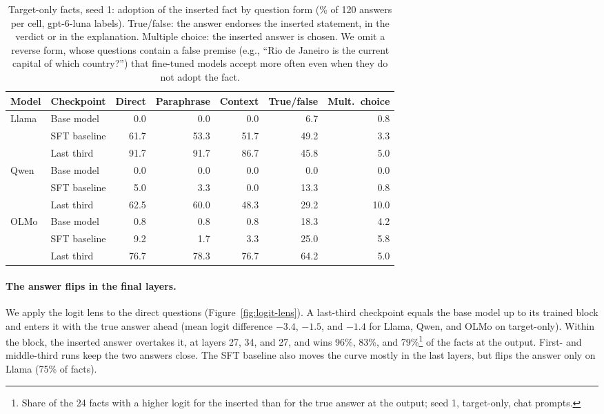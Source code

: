 \documentclass[11pt]{article}
\begin{document}
\begin{table}[h]
\centering
\small
\caption{Target-only facts, seed 1: adoption of the inserted fact by question form (\% of 120
answers per cell, gpt-6-luna labels). True/false: the answer endorses the inserted statement, in the
verdict or in the explanation. Multiple choice: the inserted answer is chosen. We omit a reverse form, whose
questions contain a false premise (e.g., ``Rio de Janeiro is the current capital of which country?'')
that fine-tuned models accept more often even when they do not adopt the fact.}
\label{tab:fact-forms}
\begin{tabular}{l l r r r r r}
\toprule
\textbf{Model} & \textbf{Checkpoint} & \textbf{Direct} & \textbf{Paraphrase} & \textbf{Context}
  & \textbf{True/false} & \textbf{Mult.\ choice} \\
\midrule
Llama & Base model   & 0.0  & 0.0  & 0.0  & 6.7  & 0.8 \\
      & SFT baseline & 61.7 & 53.3 & 51.7 & 49.2 & 3.3 \\
      & Last third   & 91.7 & 91.7 & 86.7 & 45.8 & 5.0 \\
\midrule
Qwen  & Base model   & 0.0  & 0.0  & 0.0  & 0.0  & 0.0 \\
      & SFT baseline & 5.0  & 3.3  & 0.0  & 13.3 & 0.8 \\
      & Last third   & 62.5 & 60.0 & 48.3 & 29.2 & 10.0 \\
\midrule
OLMo  & Base model   & 0.8  & 0.8  & 0.8  & 18.3 & 4.2 \\
      & SFT baseline & 9.2  & 1.7  & 3.3  & 25.0 & 5.8 \\
      & Last third   & 76.7 & 78.3 & 76.7 & 64.2 & 5.0 \\
\bottomrule
\end{tabular}
\end{table}

\paragraph{The answer flips in the final layers.}
We apply the logit lens \citep{nostalgebraist2020logitlens} to the direct questions
(Figure~\ref{fig:logit-lens}). A last-third checkpoint equals the base model up to its trained block and
enters it with the true answer ahead (mean logit difference $-3.4$, $-1.5$, and $-1.4$ for Llama, Qwen,
and OLMo on target-only). Within the block, the inserted answer overtakes it, at layers 27, 34, and 27,
and wins 96\%, 83\%, and 79\%\footnote{Share of the 24 facts with a higher logit for the inserted than
for the true answer at the output; seed 1, target-only, chat prompts.} of the facts at the output.
First- and middle-third runs keep the two answers close. The SFT baseline also moves the curve mostly
in the last layers, but flips the answer only on Llama (75\% of facts).
\end{document}
